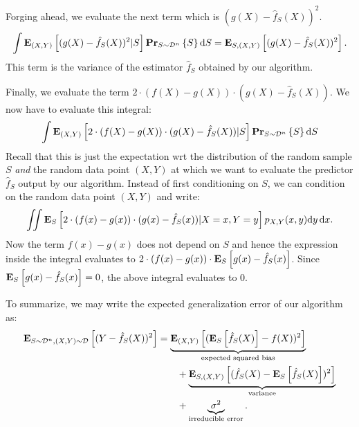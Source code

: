 Forging ahead, we evaluate the next term which is $(g(X) - \hat{f}_S(X))^2$.
\begin{equation}
    \int \mathbf{E}_{(X, Y)} \left [ (g(X) - \hat{f}_S(X))^2 \vert S \right ] \mathbf{Pr}_{S \sim \mathcal{D}^n} \left \{ S \right \} \text{d} S
    = \mathbf{E}_{S, (X, Y)} \left [ (g(X) - \hat{f}_S(X))^2 \right ].
\end{equation}
This term is the variance of the estimator $\hat{f}_S$ obtained by our algorithm.

Finally, we evaluate the term $2 \cdot (f(X) - g(X)) \cdot (g(X) - \hat{f}_S(X))$. We now
have to evaluate this integral:
\begin{equation}
    \int \mathbf{E}_{(X, Y)} \left [ 2 \cdot (f(X) - g(X)) \cdot (g(X) - \hat{f}_S(X)) \vert S \right ] \mathbf{Pr}_{S \sim \mathcal{D}^n} \left \{ S \right \} \text{d} S
\end{equation}
Recall that this is just the expectation wrt the distribution of the random sample
$S$ \emph{and} the random data point $(X, Y)$ at which we want to evaluate the predictor
$\hat{f}_S$ output by our algorithm. Instead of first conditioning on $S$, we can condition
on the random data point $(X, Y)$ and write:
\begin{equation}
    \iint \mathbf{E}_{S} \left [ 2 \cdot (f(x) - g(x)) \cdot (g(x) - \hat{f}_S(x)) \vert X = x, Y = y \right ] p_{X, Y}(x, y) \text{d} y \, \text{d} x.
\end{equation}
Now the term $f(x) - g(x)$ does not depend on $S$ and hence the expression inside the
integral evaluates to $2 \cdot (f(x) - g(x)) \cdot \mathbf{E}_{S} \left [ g(x) - \hat{f}_S(x) \right ]$. Since
$\mathbf{E}_{S} \left [ g(x) - \hat{f}_S(x) \right ] = 0$, the above integral evaluates to $0$.

To summarize, we may write the expected generalization error of our algorithm
as:
\begin{align*}
    \mathbf{E}_{S \sim \mathcal{D}^n, (X, Y) \sim \mathcal{D}} \left [ (Y - \hat{f}_S(X))^2 \right ]
        & =  \underbrace{\mathbf{E}_{(X, Y)} \left [ (\mathbf{E}_{S} \left [ \hat{f}_S(X) \right ] - f(X) )^2 \right ]}_{\text{expected squared bias}}  \\
        & \quad \quad + \underbrace{\mathbf{E}_{S, (X, Y)} \left [ ( \hat{f}_S(X) - \mathbf{E}_{S} \left [ \hat{f}_S(X) \right ] )^2 \right ]}_{\text{variance}} \\
        & \quad \quad + \underbrace{\sigma^2}_{\text{irreducible error}}.
\end{align*}
